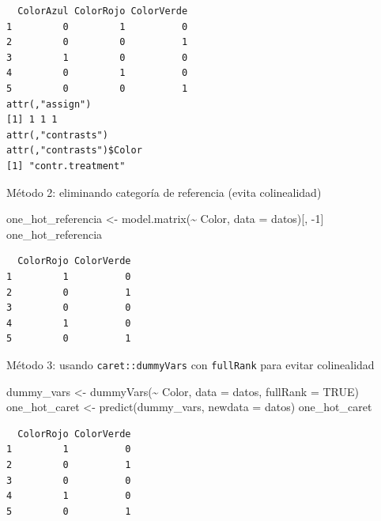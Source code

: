 \documentclass[
  letterpaper,
  DIV=11,
  numbers=noendperiod]{scrreprt}
\newenvironment{Shaded}{\begin{snugshade}}{\end{snugshade}}
\newcommand{\AttributeTok}[1]{\textcolor[rgb]{0.40,0.45,0.13}{#1}}
\newcommand{\ConstantTok}[1]{\textcolor[rgb]{0.56,0.35,0.01}{#1}}
\newcommand{\DecValTok}[1]{\textcolor[rgb]{0.68,0.00,0.00}{#1}}
\newcommand{\FunctionTok}[1]{\textcolor[rgb]{0.28,0.35,0.67}{#1}}
\newcommand{\NormalTok}[1]{\textcolor[rgb]{0.00,0.23,0.31}{#1}}
\newcommand{\OtherTok}[1]{\textcolor[rgb]{0.00,0.23,0.31}{#1}}
\newcommand{\SpecialCharTok}[1]{\textcolor[rgb]{0.37,0.37,0.37}{#1}}
\begin{document}
\begin{tcolorbox}
\begin{verbatim}
  ColorAzul ColorRojo ColorVerde
1         0         1          0
2         0         0          1
3         1         0          0
4         0         1          0
5         0         0          1
attr(,"assign")
[1] 1 1 1
attr(,"contrasts")
attr(,"contrasts")$Color
[1] "contr.treatment"
\end{verbatim}

Método 2: eliminando categoría de referencia (evita colinealidad)

\begin{Shaded}
\begin{Highlighting}[]
\NormalTok{one\_hot\_referencia }\OtherTok{\textless{}{-}} \FunctionTok{model.matrix}\NormalTok{(}\SpecialCharTok{\textasciitilde{}}\NormalTok{ Color, }\AttributeTok{data =}\NormalTok{ datos)[, }\SpecialCharTok{{-}}\DecValTok{1}\NormalTok{]}
\NormalTok{one\_hot\_referencia}
\end{Highlighting}
\end{Shaded}

\begin{verbatim}
  ColorRojo ColorVerde
1         1          0
2         0          1
3         0          0
4         1          0
5         0          1
\end{verbatim}

Método 3: usando \texttt{caret::dummyVars} con \texttt{fullRank} para
evitar colinealidad

\begin{Shaded}
\begin{Highlighting}[]
\NormalTok{dummy\_vars }\OtherTok{\textless{}{-}} \FunctionTok{dummyVars}\NormalTok{(}\SpecialCharTok{\textasciitilde{}}\NormalTok{ Color, }\AttributeTok{data =}\NormalTok{ datos, }\AttributeTok{fullRank =} \ConstantTok{TRUE}\NormalTok{)}
\NormalTok{one\_hot\_caret }\OtherTok{\textless{}{-}} \FunctionTok{predict}\NormalTok{(dummy\_vars, }\AttributeTok{newdata =}\NormalTok{ datos)}
\NormalTok{one\_hot\_caret}
\end{Highlighting}
\end{Shaded}

\begin{verbatim}
  ColorRojo ColorVerde
1         1          0
2         0          1
3         0          0
4         1          0
5         0          1
\end{verbatim}

\end{tcolorbox}
\end{document}
